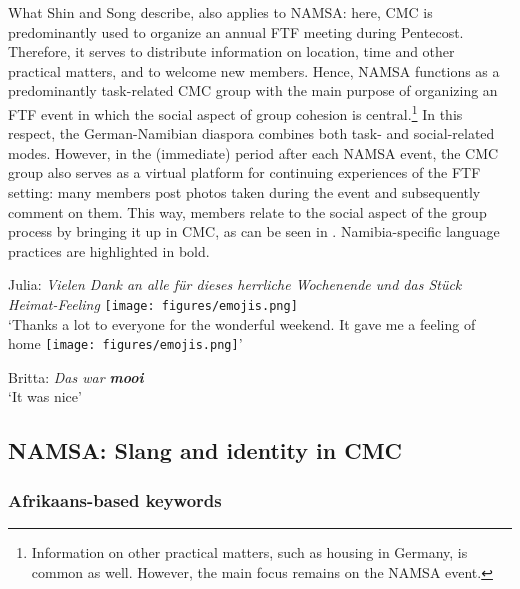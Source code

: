 \documentclass[output=paper]{langsci/langscibook}
\begin{document}
What Shin and Song describe, also applies to NAMSA: here, CMC is predominantly used to organize an annual FTF meeting during Pentecost. Therefore, it serves to distribute information on location, time and other practical matters, and to welcome new members. Hence, NAMSA functions as a predominantly task-related CMC group with the main purpose of organizing an FTF event in which the social aspect of group cohesion is central.\footnote{Information on other practical matters, such as housing in Germany, is common as well. However, the main focus remains on the NAMSA event.} In this respect, the German-Namibian diaspora combines both task- and social-related modes. However, in the (immediate) period after each NAMSA event, the CMC group also serves as a virtual platform for continuing experiences of the FTF setting: many members post photos taken during the event and subsequently comment on them. This way, members relate to the social aspect of the group process by bringing it up in CMC, as can be seen in . Namibia-specific language practices are highlighted in bold.


\ea\label{ex:radke:4}
	\ea Julia: \textit{Vielen Dank an alle für dieses herrliche Wochenende und das Stück Heimat-Feeling} \texttt{[image: figures/emojis.png]}\\
	
	‘Thanks a lot to everyone for the wonderful weekend. It gave me a feeling of home  \texttt{[image: figures/emojis.png]}’

	\ex Britta: \textit{Das war \textbf{mooi}} \\

	‘It was nice’
\z
\z
   
\subsection{NAMSA: Slang and identity in CMC} 
  \label{sec:radke:3.4}
  
  \subsubsection{Afrikaans-based keywords}
 \label{sec:radke:3.4.1}
\end{document}
